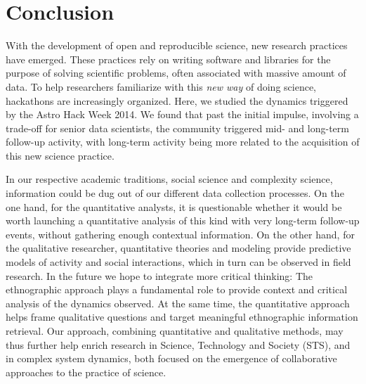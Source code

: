\section{Conclusion}
With the development of open and reproducible science, new research practices have emerged. These practices rely on writing software and libraries for the purpose of solving scientific problems, often associated with massive amount of data. To help researchers familiarize with this {\it new way} of doing science, hackathons are increasingly organized. Here, we studied the dynamics triggered by the Astro Hack Week 2014. We found that past the initial impulse, involving a trade-off for senior data scientists, the community triggered mid- and long-term follow-up activity, with long-term activity being more related to the acquisition of this new science practice. 

In our respective academic traditions, social science and complexity science, information could be dug out of our different data collection processes. On the one hand, for the quantitative analysts, it is questionable whether it would be worth launching a quantitative analysis of this kind with very long-term follow-up events, without gathering enough contextual information. On the other hand, for the qualitative researcher, quantitative theories and modeling provide predictive models of activity and social interactions, which in turn can be observed in field research. In the future we hope to integrate more critical thinking: The ethnographic approach plays a fundamental role to provide context and critical analysis of the dynamics observed. At the same time, the quantitative approach helps frame qualitative questions and target meaningful ethnographic information retrieval. Our approach, combining quantitative and qualitative methods, may thus further help enrich research in Science, Technology and Society (STS), and in complex system dynamics, both focused on the emergence of collaborative approaches to the practice of science.



